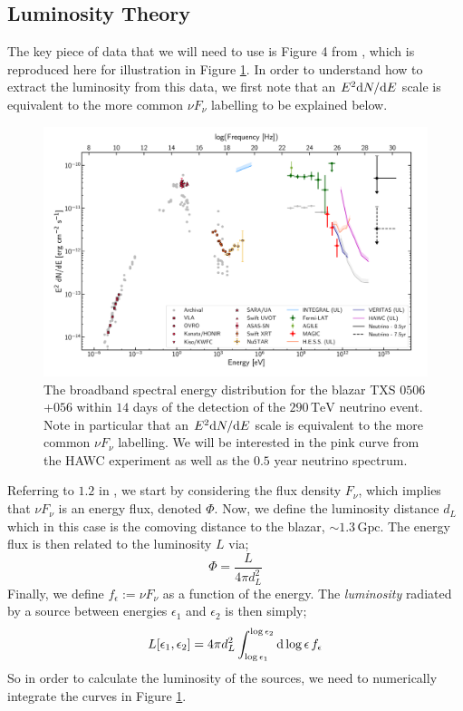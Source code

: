 \documentclass[10pt]{article}
\begin{document}
\subsection{Luminosity Theory}
The key piece of data that we will need to use is Figure 4 from \cite{Ackermann2018}, which is reproduced here for illustration in Figure \ref{fig:spectrum}. In order to understand how to extract the luminosity from this data, we first note that an $E^2 \text{d} N/\text{d} E$ scale is equivalent to the more common $\nu F_\nu$ labelling to be explained below.
\begin{figure}
  \begin{framed}
  \centering
  \includegraphics[width=0.7\linewidth]{icecube_spectrum}
  \caption{The broadband spectral energy distribution for the blazar TXS $0506$+$056$ \cite{Ackermann2018} within $14$ days of the detection of the $290\,\textrm{TeV}$ neutrino event. Note in particular that an $E^2 \text{d} N/\text{d} E$ scale is equivalent to the more common $\nu F_\nu$ labelling. We will be interested in the pink curve from the HAWC experiment as well as the $0.5$ year neutrino spectrum.}
  \label{fig:spectrum}
  \end{framed}
\end{figure}
Referring to $1.2$ in \cite{dermer2009high}, we start by considering the flux density $F_\nu$, which implies that $\nu F_\nu$ is an energy flux, denoted $\Phi$. Now, we define the luminosity distance $d_L$ which in this case is the comoving distance to the blazar, $\sim 1.3 \, \textrm{Gpc}$. The energy flux is then related to the luminosity $L$ via;
\begin{equation}
  \Phi = \frac{L}{4\pi d_L^2}
\end{equation}
Finally, we define $f_\epsilon := \nu F_\nu$ as a function of the energy. The \textit{luminosity} radiated by a source between energies $\epsilon_1$ and $\epsilon_2$ is then simply;
\begin{equation}
  L[\epsilon_1, \epsilon_2] = 4\pi d_L^2 \int_{\log \epsilon_1}^{\log \epsilon_2}{\text{d}\log\epsilon \,f_\epsilon}
\end{equation}
So in order to calculate the luminosity of the sources, we need to numerically integrate the curves in Figure \ref{fig:spectrum}.
\end{document}
